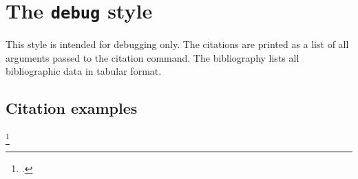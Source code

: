 \documentclass[a4paper]{article}
\begin{document}
\section*{The \texttt{debug} style}

This style is intended for debugging only. The citations are printed as a list of all arguments passed to the citation command. The bibliography lists all bibliographic data in tabular format.

\subsection*{Citation examples}

\cite{companion}

\parencite[30]{companion}

\footcite[see][]{companion}

\cite[see][30]{companion}

\cites(see)()[30]{companion}

\printbibliography
\end{document}
